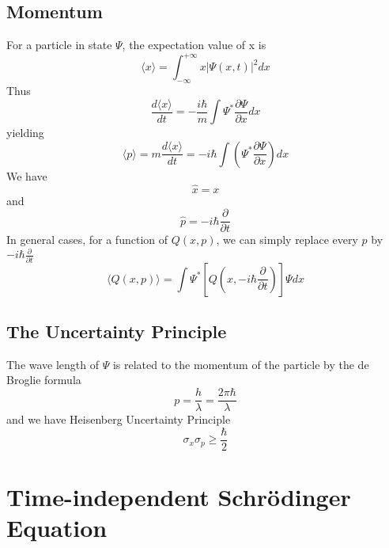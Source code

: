 \documentclass{article}
\numberwithin{equation}{section}
\begin{document}
\subsection{Momentum}
For a particle in state $\Psi$, the expectation value of x is
\begin{equation}
	\langle x\rangle=\int_{-\infty}^{+\infty}x|\Psi(x,t)|^2dx
\end{equation}
Thus
\begin{equation}
	\frac{d\langle x\rangle}{dt}=-\frac{i\hbar}{m}\int\Psi^*\frac{\partial \Psi}{\partial x}dx
\end{equation}
yielding
\begin{equation}
	\langle p\rangle=m\frac{d\langle x\rangle}{dt}=-i\hbar\int(\Psi^*\frac{\partial \Psi}{\partial x})dx
\end{equation}
We have 
\begin{equation}
	\hat{x}=x
\end{equation}
and
\begin{equation}
	\hat{p}=-i\hbar\frac{\partial}{\partial t}
\end{equation}
In general cases, for a function of $Q(x,p)$, we can simply replace every $p$ by $-i\hbar\frac{\partial}{\partial t}$
\begin{equation}
	\langle Q(x,p)\rangle=\int\Psi^*[Q(x,-i\hbar\frac{\partial}{\partial t})]\Psi dx
\end{equation}
\subsection{The Uncertainty Principle}
The wave length of $\Psi$ is related to the momentum of the particle by the de Broglie formula
\begin{equation}
	p=\frac{h}{\lambda}=\frac{2\pi\hbar}{\lambda}
\end{equation}
and we have Heisenberg Uncertainty Principle
\begin{equation}
	\sigma_x\sigma_p\geq\frac{\hbar}{2}
\end{equation}
\newpage
\section{Time-independent Schrödinger Equation}
\end{document}
